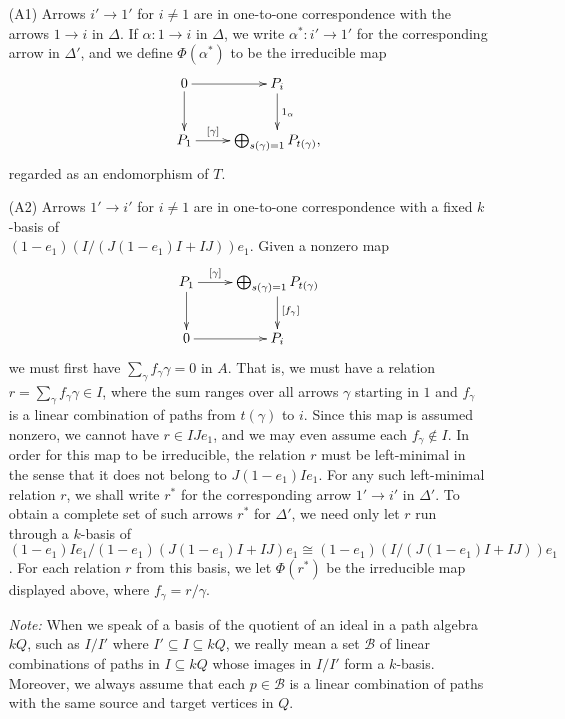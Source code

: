 \documentclass{amsart}
\begin{document}
\begin{itemize}
\item[(A1)] Arrows $i' \rightarrow 1'$ for $i \neq 1$ are in one-to-one correspondence with the arrows $1 \rightarrow i$ in $\Delta$.  If $\alpha : 1 \rightarrow i$ in $\Delta$, we write $\alpha^* : i' \rightarrow 1'$ for the corresponding arrow in $\Delta'$, and we define $\Phi(\alpha^*)$ to be the irreducible map 
$$\xymatrix{0 \ar[r] \ar[d] & P_i \ar[d]^{1_{\alpha}} \\P_1 \ar[r]^-{[\gamma]} & \bigoplus_{s(\gamma)=1} P_{t(\gamma)},}$$ 
regarded as an endomorphism of $T$.

\vspace{2mm}
\item[(A2)]  Arrows $1' \rightarrow i'$ for $i \neq 1$ are in one-to-one correspondence with a fixed $k$-basis of \\ $(1-e_1)(I/(J(1-e_1)I+IJ))e_1$.  Given a nonzero map 
$$\xymatrix{ P_1 \ar[d] \ar[r]^-{[\gamma]} & \bigoplus_{s(\gamma)=1} P_{t(\gamma)} \ar[d]^{[f_{\gamma}]} \\ 0 \ar[r] & P_i}$$ 
we must first have $\sum_{\gamma} f_{\gamma} \gamma = 0$ in $A$.  That is, we must have a relation $r = \sum_{\gamma} f_{\gamma} \gamma \in I$, where the sum ranges over all arrows $\gamma$ starting in $1$ and $f_{\gamma}$ is a linear combination of paths from $t(\gamma)$ to $i$.  Since this map is assumed nonzero, we cannot have $r \in IJe_1$, and we may even assume each $f_{\gamma} \notin I$.  In order for this map to be irreducible, the relation $r$ must be left-minimal in the sense that it does not belong to $J (1-e_1)Ie_1$.  For any such left-minimal relation $r$, we shall write $r^*$ for the corresponding arrow $1' \rightarrow i'$ in $\Delta'$.  To obtain a complete set of such arrows $r^*$ for $\Delta'$, we need only let $r$ run through a $k$-basis of $(1-e_1)Ie_1/(1-e_1)(J(1-e_1)I+IJ)e_1 \cong (1-e_1)(I/(J(1-e_1)I+IJ))e_1$.  For each relation $r$ from this basis, we let $\Phi(r^*)$ be the irreducible map displayed above, where $f_{\gamma} = r/\gamma$.

\vspace{2mm}
\noindent
{\it Note:} When we speak of a basis of the quotient of an ideal in a path algebra $kQ$, such as $I/I'$ where $I' \subseteq I \subseteq kQ$, we really mean a set $\mathcal{B}$ of linear combinations of paths in $I \subseteq kQ$ whose images in $I/I'$ form a $k$-basis.  Moreover, we always assume that each $p \in \mathcal{B}$ is a linear combination of paths with the same source and target vertices in $Q$.



\end{itemize}
\end{document}

